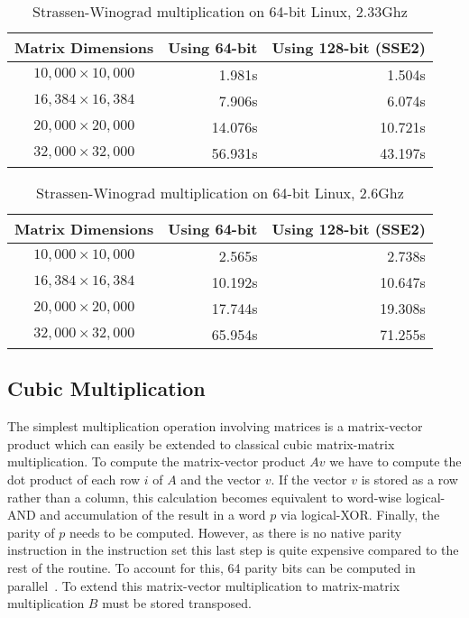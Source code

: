 \begin{table}[htbp]
\begin{center}
\begin{tabular}{|c|r|r|}
\hline
Matrix Dimensions      &  Using 64-bit & Using 128-bit (SSE2)\\
\hline
$10,000 \times 10,000$ &         1.981s &  1.504s\\ 
$16,384 \times 16,384$ &         7.906s &  6.074s\\ 
$20,000 \times 20,000$ &        14.076s & 10.721s\\ 
$32,000 \times 32,000$ &        56.931s & 43.197s\\ 
\hline
\end{tabular}
\caption{Strassen-Winograd multiplication on 64-bit Linux, 2.33Ghz
\CTD}
\label{tab:m4rm-sse2-c2d}
\end{center}
\end{table}

\begin{table}[htbp]
\begin{center}
\begin{tabular}{|c|r|r|}
\hline
Matrix Dimensions      &  Using 64-bit & Using 128-bit (SSE2)\\
\hline
$10,000 \times 10,000$ &   2.565s &  2.738s\\ 
$16,384 \times 16,384$ &  10.192s & 10.647s\\ 
$20,000 \times 20,000$ &  17.744s & 19.308s\\ 
$32,000 \times 32,000$ &  65.954s & 71.255s\\ 
\hline
\end{tabular}
\caption{Strassen-Winograd multiplication on 64-bit Linux, 2.6Ghz
\Opteron}
\label{tab:m4rm-sse2-opteron}
\end{center}
\end{table}

\subsection{Cubic Multiplication}
\label{sec:cubic}
The simplest multiplication operation involving matrices is a matrix-vector product which can easily be extended to classical cubic matrix-matrix
multiplication. To compute the matrix-vector product $Av$ we have to compute the dot product of each row $i$ of $A$ and the vector $v$. If the vector $v$ is stored as a row rather than a column, this calculation becomes equivalent to word-wise logical-AND and accumulation of the result in a word $p$ via logical-XOR. Finally, the parity of $p$ needs to be computed. However, as there is no native parity instruction in the \xBG instruction set this last step is quite expensive compared to the rest of the routine. To account for this, 64 parity bits can be computed in parallel~\cite[Ch. 5]{hackersdelight}. To extend this matrix-vector multiplication to matrix-matrix multiplication $B$ must be stored transposed.

